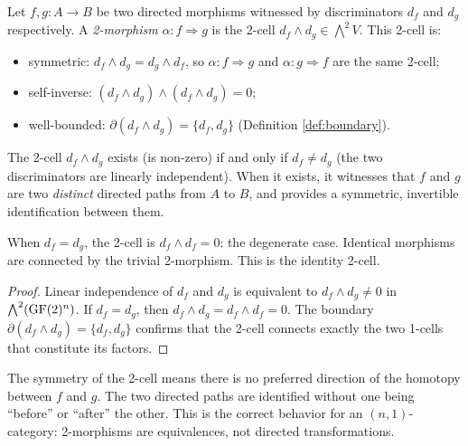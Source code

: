\begin{definition}\label{def:directed-homotopy}
Let $f, g: A \to B$ be two directed morphisms witnessed by
discriminators $d_f$ and $d_g$ respectively. A
\emph{2-morphism} $\alpha: f \Rightarrow g$ is the 2-cell
$d_f \wedge d_g \in \bigwedge^2 V$. This 2-cell is:
\begin{itemize}[nosep]
  \item symmetric: $d_f \wedge d_g = d_g \wedge d_f$, so
    $\alpha: f \Rightarrow g$ and $\alpha: g \Rightarrow f$
    are the same 2-cell;
  \item self-inverse: $(d_f \wedge d_g) \wedge (d_f \wedge d_g) = 0$;
  \item well-bounded: $\partial(d_f \wedge d_g) = \{d_f, d_g\}$
    (Definition \ref{def:boundary}).
\end{itemize}
\end{definition}

\begin{proposition}\label{prop:2morph}
The 2-cell $d_f \wedge d_g$ exists (is non-zero) if and
only if $d_f \neq d_g$ (the two discriminators are
linearly independent). When it exists, it witnesses that
$f$ and $g$ are two \emph{distinct} directed paths from
$A$ to $B$, and provides a symmetric, invertible
identification between them.

When $d_f = d_g$, the 2-cell is $d_f \wedge d_f = 0$:
the degenerate case. Identical morphisms are connected
by the trivial 2-morphism. This is the identity 2-cell.
\end{proposition}

\begin{proof}
Linear independence of $d_f$ and $d_g$ is equivalent to
$d_f \wedge d_g \neq 0$ in $\bigwedge^2(\operatorname{GF}(2)^n)$.
If $d_f = d_g$, then $d_f \wedge d_g = d_f \wedge d_f = 0$.
The boundary $\partial(d_f \wedge d_g) = \{d_f, d_g\}$
confirms that the 2-cell connects exactly the two
1-cells that constitute its factors.
\end{proof}

\begin{remark}
The symmetry of the 2-cell means there is no preferred
direction of the homotopy between $f$ and $g$. The
two directed paths are identified without one being
``before'' or ``after'' the other. This is the correct
behavior for an $(n,1)$-category: 2-morphisms are
equivalences, not directed transformations.
\end{remark}

